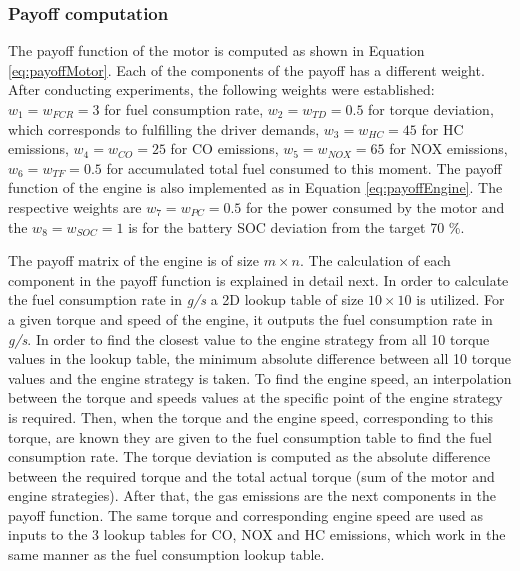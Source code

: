 \subsubsection{Payoff computation}
The payoff function of the motor is computed as shown in Equation \ref{eq:payoffMotor}. Each of the components of the payoff has a different weight. After conducting experiments, the following weights were established: $w_1 = w_{FCR} = 3$ for fuel consumption rate, $w_2 = w_{TD} = 0.5$ for torque deviation, which corresponds to fulfilling the driver demands, $w_3 = w_{HC} = 45$ for HC emissions, $w_4 = w_{CO} = 25$ for CO emissions, $w_5 = w_{NOX} = 65$ for NOX emissions, $w_6 = w_{TF} = 0.5$ for accumulated total fuel consumed to this moment.
The payoff function of the engine is also implemented as in Equation \ref{eq:payoffEngine}. The respective weights are $w_7 = w_{PC} = 0.5$ for the power consumed by the motor and the $w_8 = w_{SOC} = 1$ is for the battery SOC deviation from the target 70 \%.

The payoff matrix of the engine is of size $m \times n$. The calculation of each component in the payoff function is explained in detail next. In order to calculate the fuel consumption rate in \textit{g/s} a 2D lookup table of size $10 \times 10$ is utilized. For a given torque and speed of the engine, it outputs the fuel consumption rate in \textit{g/s}. In order to find the closest value to the engine strategy from all 10 torque values in the lookup table, the minimum absolute difference between all 10 torque values and the engine strategy is taken. To find the engine speed, an interpolation between the torque and speeds values at the specific point of the engine strategy is required. Then, when the torque and the engine speed, corresponding to this torque, are known they are given to the fuel consumption table to find the fuel consumption rate. The torque deviation is computed as the absolute difference between the required torque and the total actual torque (sum of the motor and engine strategies). After that, the gas emissions are the next components in the payoff function. The same torque and corresponding engine speed are used as inputs to the 3 lookup tables for CO, NOX and HC emissions, which work in the same manner as the fuel consumption lookup table.

